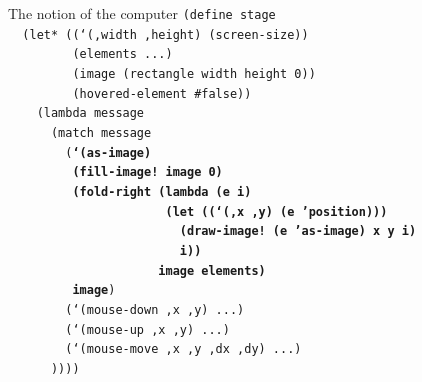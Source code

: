 \documentclass{beamer}
\begin{document}
\begin{frame}{The notion of the computer}
  \scriptsize
  \texttt{(define stage\\
    \ \ (let* ((`(,width ,height) (screen-size))\\
    \ \ \ \ \ \ \ \ \ (elements ...)\\
    \ \ \ \ \ \ \ \ \ (image (rectangle width height 0))\\
    \ \ \ \ \ \ \ \ \ (hovered-element \#false))\\
    \ \ \ \ (lambda message\\
    \ \ \ \ \ \ (match message\\
    \ \ \ \ \ \ \ \ (\textbf{`(as-image)\\
      \ \ \ \ \ \ \ \ \ (fill-image!\ image 0)\\
      \ \ \ \ \ \ \ \ \ (fold-right (lambda (e i)\\
      \ \ \ \ \ \ \ \ \ \ \ \ \ \ \ \ \ \ \ \ \ \ (let ((`(,x ,y) (e 'position)))\\
      \ \ \ \ \ \ \ \ \ \ \ \ \ \ \ \ \ \ \ \ \ \ \ \ (draw-image!\ (e 'as-image) x y i)\\
      \ \ \ \ \ \ \ \ \ \ \ \ \ \ \ \ \ \ \ \ \ \ \ \ i))\\
      \ \ \ \ \ \ \ \ \ \ \ \ \ \ \ \ \ \ \ \ \ image elements)\\
      \ \ \ \ \ \ \ \ \ image})\\
    \ \ \ \ \ \ \ \ (`(mouse-down ,x ,y) ...)\\
    \ \ \ \ \ \ \ \ (`(mouse-up ,x ,y) ...)\\
    \ \ \ \ \ \ \ \ (`(mouse-move ,x ,y ,dx ,dy) ...)\\
    \ \ \ \ \ \ ))))\\
    \ \\
    \ \\
    \ 
}
\end{frame}
\end{document}
